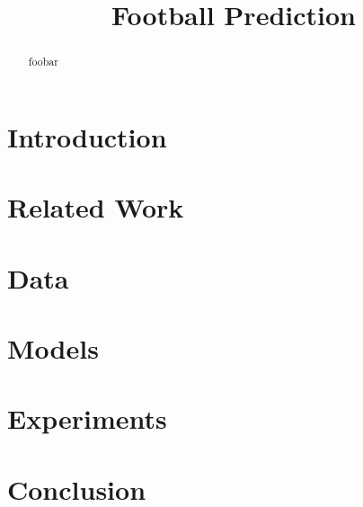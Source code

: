 \documentclass[a4paper]{article}
\title{Football Prediction}
\begin{document}
\maketitle
%
\begin{abstract}
foobar
\end{abstract}


%
\section{Introduction}


\section{Related Work}

\section{Data}


\section{Models}




\section{Experiments}


\section{Conclusion}




%
%
\end{document}
